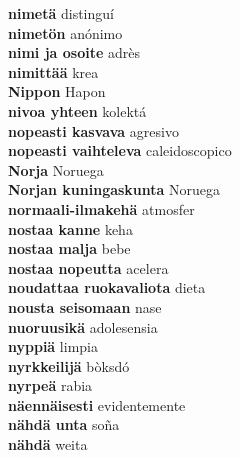 \textbf{ nimetä  } distinguí \\
\textbf{ nimetön  } anónimo \\
\textbf{ nimi ja osoite  } adrès \\
\textbf{ nimittää  } krea \\
\textbf{ Nippon  } Hapon \\
\textbf{ nivoa yhteen  } kolektá \\
\textbf{ nopeasti kasvava  } agresivo \\
\textbf{ nopeasti vaihteleva  } caleidoscopico \\
\textbf{ Norja  } Noruega \\
\textbf{ Norjan  kuningaskunta  } Noruega \\
\textbf{ normaali-ilmakehä  } atmosfer \\
\textbf{ nostaa kanne  } keha \\
\textbf{ nostaa malja  } bebe \\
\textbf{ nostaa nopeutta  } acelera \\
\textbf{ noudattaa ruokavaliota  } dieta \\
\textbf{ nousta seisomaan  } nase \\
\textbf{ nuoruusikä  } adolesensia \\
\textbf{ nyppiä  } limpia \\
\textbf{ nyrkkeilijä  } bòksdó \\
\textbf{ nyrpeä  } rabia \\
\textbf{ näennäisesti  } evidentemente \\
\textbf{ nähdä unta  } soña \\
\textbf{ nähdä  } weita \\
